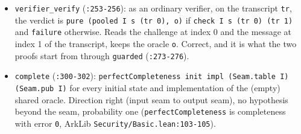 \begin{itemize}
\item \texttt{verifier\_\allowbreak{}verify} (\texttt{:253-{}256}): as an ordinary verifier, on the transcript \texttt{tr}, the verdict is \texttt{pure (\allowbreak{}pooled I s (\allowbreak{}tr 0),\allowbreak{} o)} if \texttt{check I s (\allowbreak{}tr 0) (\allowbreak{}tr 1)} and \texttt{failure} otherwise. Reads the challenge at index 0 and the message at index 1 of the transcript, keeps the oracle \texttt{o}. Correct, and it is what the two proofs start from through \texttt{guarded} (\texttt{:273-{}276}).
\item \texttt{complete} (\texttt{:300-{}302}): \texttt{p\allowbreak{}e\allowbreak{}r\allowbreak{}f\allowbreak{}e\allowbreak{}c\allowbreak{}t\allowbreak{}C\allowbreak{}o\allowbreak{}m\allowbreak{}p\allowbreak{}l\allowbreak{}e\allowbreak{}t\allowbreak{}e\allowbreak{}n\allowbreak{}e\allowbreak{}s\allowbreak{}s\allowbreak{} i\allowbreak{}n\allowbreak{}i\allowbreak{}t\allowbreak{} i\allowbreak{}m\allowbreak{}p\allowbreak{}l\allowbreak{} (\allowbreak{}S\allowbreak{}e\allowbreak{}a\allowbreak{}m\allowbreak{}.\allowbreak{}t\allowbreak{}a\allowbreak{}b\allowbreak{}l\allowbreak{}e\allowbreak{} I\allowbreak{})\allowbreak{} (\allowbreak{}S\allowbreak{}e\allowbreak{}a\allowbreak{}m\allowbreak{}.\allowbreak{}p\allowbreak{}u\allowbreak{}b\allowbreak{} I\allowbreak{})} for every initial state and implementation of the (empty) shared oracle. Direction right (input seam to output seam), no hypothesis beyond the seam, probability one (\texttt{perfectCompleteness} is completeness with error \texttt{0}, ArkLib \texttt{Security/\allowbreak{}Basic.\allowbreak{}lean:103-{}105}).

\end{itemize}
